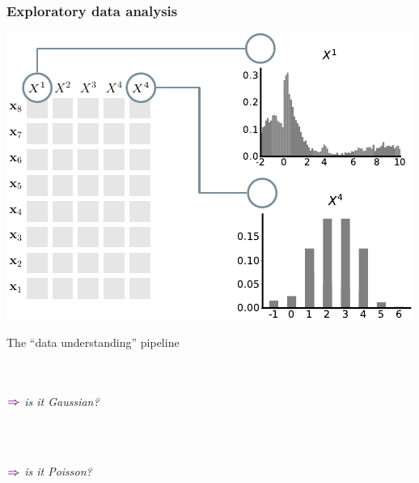\documentclass[xcolor={usenames,dvipsnames,svgnames}, compress, aspectratio=169, 11pt]{beamer}
\newcommand{\comment}[3][\small]{\begin{minipage}{1\linewidth}
          \raggedleft
          {
            $\color{violet}\boldsymbol\Rightarrow$
            #1
            {\emph{#2}}
          }
      \end{minipage}#3\\
}
\begin{document}
\begin{frame}[t, htt=bgrey2]
  \frametitle{Exploratory data analysis}

  \large
  \begin{minipage}[t]{0.6\linewidth}
    \includegraphics[width=.99\linewidth]{figures/abda-hist-type}
  \end{minipage}\hfill\begin{minipage}[t]{0.4\linewidth}
    \vspace{-150pt}
    {The ``data understanding'' pipeline}\\[5pt]
    \\
    \\
    \comment[\normalsize]{is it Gaussian?}{}\\
    \comment[\normalsize]{is it Poisson?}{}\\
  \end{minipage}  
\end{frame}
\end{document}
